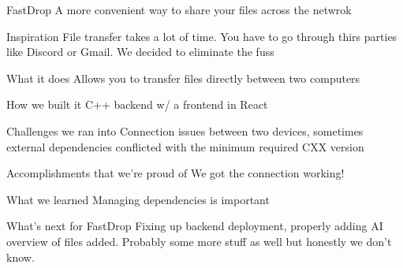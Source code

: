 FastDrop
A more convenient way to share your files across the netwrok

Inspiration
File transfer takes a lot of time. You have to go through thirs parties like Discord or Gmail. We decided to eliminate the fuss

What it does
Allows you to transfer files directly between two computers

How we built it
C++ backend w/ a frontend in React

Challenges we ran into
Connection issues between two devices, sometimes external dependencies conflicted with the minimum required CXX version

Accomplishments that we're proud of
We got the connection working!

What we learned
Managing dependencies is important

What's next for FastDrop
Fixing up backend deployment, properly adding AI overview of files added. Probably some more stuff as well but honestly we don't know.
